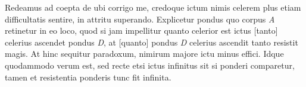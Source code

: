 \noindent {}%
    \pend
    \newpage
\pstart 
  Redeamus ad coepta de ubi corrigo me, credoque ictum\protect{} nimis celerem plus etiam difficultatis sentire, in attritu\protect{} superando. Explicetur  pondus quo corpus \textit{A} retinetur in eo loco, quod si jam impellitur quanto celerior est ictus\protect{} [tanto] celerius ascendet pondus \textit{D}, at [quanto] pondus 
\textit{D} celerius ascendit tanto resistit magis. At hinc sequitur paradoxum, nimirum majore ictu\protect{} minus effici. Idque quodammodo verum est, sed recte  etsi ictus\protect{} infinitus sit si ponderi comparetur, tamen et resistentia\protect{} ponderis tunc fit infinita. 
